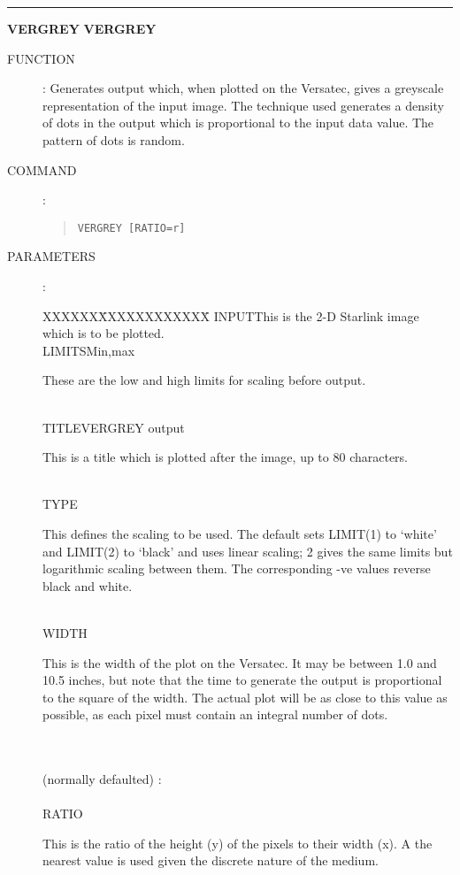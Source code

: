 \goodbreak
\rule{\textwidth}{0.3mm}
{\Large {\bf VERGREY} \hfill {\bf VERGREY}}
\begin{description}
\item [FUNCTION]:
Generates output which, when plotted on the Versatec, gives a greyscale
representation of the input image.
The technique used generates a density of dots in the output which is
proportional to the input data value.
The pattern of dots is random.
\item [COMMAND]:
\begin{quote}
{\tt VERGREY  [RATIO=r]}
\end{quote}
\item [PARAMETERS] :
\begin{tabbing}
XXXXXX\=XXXXXXXXXXXX\=\kill
INPUT\>\>This is the 2-D Starlink image which is to be plotted.\\
LIMITS\>Min,max\>\begin{minipage}[t]{100mm}
These are the low and high limits for scaling before output.
\end{minipage}\\
TITLE\>VERGREY output\>\begin{minipage}[t]{100mm}
This is a title which is plotted after the image, up to 80 characters.
\end{minipage}\\
TYPE\>\begin{minipage}[t]{100mm}
This defines the scaling to be used.
The default sets LIMIT(1) to `white' and LIMIT(2) to `black' and uses linear
scaling; 2 gives the same limits but logarithmic scaling between them.
The corresponding -ve values reverse black and white.
\end{minipage}\\
WIDTH\>\begin{minipage}[t]{100mm}
This is the width of the plot on the Versatec.
It may be between 1.0 and 10.5 inches, but note that the time to generate the
output is proportional to the square of the width.
The actual plot will be as close to this value as possible, as each pixel must
contain an integral number of dots.
\end{minipage}\\
\\
(normally defaulted) :\\
\\
RATIO\>\begin{minipage}[t]{100mm}
This is the ratio of the height (y) of the pixels to their width (x).
A the nearest value is used given the discrete nature of the medium.

\end{minipage}
\end{tabbing}
\end{description}
